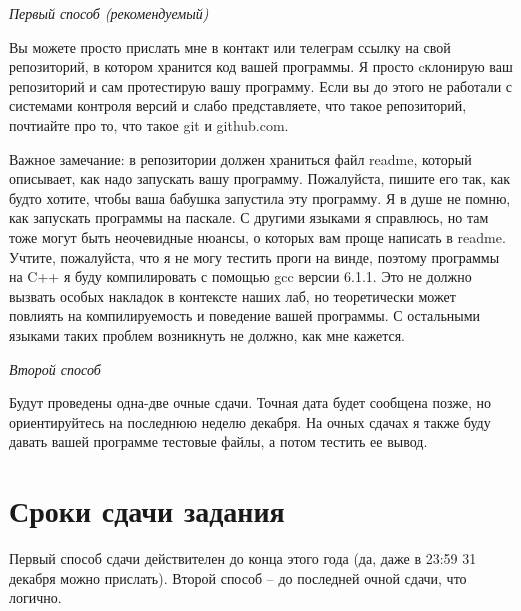 \documentclass[russian]{article}
\begin{document}
\textit{Первый способ (рекомендуемый)} 

Вы можете просто прислать мне в контакт или телеграм ссылку на свой репозиторий, в котором хранится код вашей программы. Я просто cклонирую ваш репозиторий и сам протестирую вашу программу. Если вы до этого не работали с системами контроля версий и слабо представляете, что такое репозиторий, почтиайте про то, что такое git и github.com. 

Важное замечание: в репозитории должен храниться файл readme, который описывает, как надо запускать вашу программу. Пожалуйста, пишите его так, как будто хотите, чтобы ваша бабушка запустила эту программу. Я в душе не помню, как запускать программы на паскале. С другими языками я справлюсь, но там тоже могут быть неочевидные нюансы, о которых вам проще написать в readme.
Учтите, пожалуйста, что я не могу тестить проги на винде, поэтому программы на C++ я буду компилировать с помощью gcc версии 6.1.1. Это не должно вызвать особых накладок в контексте наших лаб, но теоретически может повлиять на компилируемость и поведение вашей программы. С остальными языками таких проблем возникнуть не должно, как мне кажется.

\textit{Второй способ}

Будут проведены одна-две очные сдачи. Точная дата будет сообщена позже, но ориентируйтесь на последнюю неделю декабря. На очных сдачах я также буду давать вашей программе тестовые файлы, а потом тестить ее вывод.

\section{Сроки сдачи задания}

Первый способ сдачи действителен до конца этого года (да, даже в 23:59 31 декабря можно прислать). Второй способ -- до последней очной сдачи, что логично.
\end{document}
